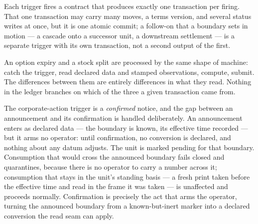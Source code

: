 Each trigger fires a contract that produces exactly one transaction per firing. That
one transaction may carry many moves, a terms version, and several status writes at
once, but it is one atomic commit; a follow-on that a boundary sets in motion --- a
cascade onto a successor unit, a downstream settlement --- is a separate trigger
with its own transaction, not a second output of the first.

An option expiry and a stock split are processed by the same shape of machine:
catch the trigger, read declared data and stamped observations, compute, submit.
The differences between them are entirely differences in what they read. Nothing
in the ledger branches on which of the three a given transaction came from.

The corporate-action trigger is a \emph{confirmed} notice, and the gap between an
announcement and its confirmation is handled deliberately. An announcement enters as
declared data --- the boundary is known, its effective time recorded --- but it arms
no operator: until confirmation, no conversion is declared, and nothing about any
datum adjusts. The unit is marked pending for that boundary. Consumption that would
cross the announced boundary fails closed and quarantines, because there is no
operator to carry a number across it; consumption that stays in the unit's standing
basis --- a fresh print taken before the effective time and read in the frame it was
taken --- is unaffected and proceeds normally. Confirmation is precisely the act
that arms the operator, turning the announced boundary from a known-but-inert marker
into a declared conversion the read seam can apply.

